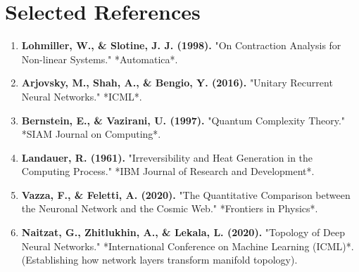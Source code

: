 \documentclass[11pt]{article}
\begin{document}
\section{Selected References}

\begin{enumerate}
    \item \textbf{Lohmiller, W., \& Slotine, J. J. (1998).} "On Contraction Analysis for Non-linear Systems." *Automatica*.
    \item \textbf{Arjovsky, M., Shah, A., \& Bengio, Y. (2016).} "Unitary Recurrent Neural Networks." *ICML*.
    \item \textbf{Bernstein, E., \& Vazirani, U. (1997).} "Quantum Complexity Theory." *SIAM Journal on Computing*.
    \item \textbf{Landauer, R. (1961).} "Irreversibility and Heat Generation in the Computing Process." *IBM Journal of Research and Development*.
    \item \textbf{Vazza, F., \& Feletti, A. (2020).} "The Quantitative Comparison between the Neuronal Network and the Cosmic Web." *Frontiers in Physics*.
    \item \textbf{Naitzat, G., Zhitlukhin, A., \& Lekala, L. (2020).} "Topology of Deep Neural Networks." *International Conference on Machine Learning (ICML)*. (Establishing how network layers transform manifold topology).
\end{enumerate}
\end{document}
